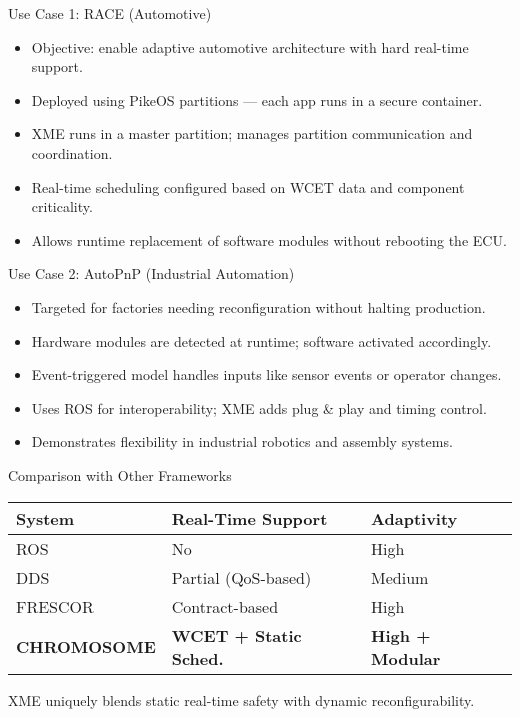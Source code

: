 \documentclass{beamer}
\begin{document}
\begin{frame}{Use Case 1: RACE (Automotive)}
  \begin{itemize}
    \item Objective: enable adaptive automotive architecture with hard real-time support.
    \item Deployed using PikeOS partitions — each app runs in a secure container.
    \item XME runs in a master partition; manages partition communication and coordination.
    \item Real-time scheduling configured based on WCET data and component criticality.
    \item Allows runtime replacement of software modules without rebooting the ECU.
  \end{itemize}
\end{frame}

\begin{frame}{Use Case 2: AutoPnP (Industrial Automation)}
  \begin{itemize}
    \item Targeted for factories needing reconfiguration without halting production.
    \item Hardware modules are detected at runtime; software activated accordingly.
    \item Event-triggered model handles inputs like sensor events or operator changes.
    \item Uses ROS for interoperability; XME adds plug \& play and timing control.
    \item Demonstrates flexibility in industrial robotics and assembly systems.
  \end{itemize}
\end{frame}

\begin{frame}{Comparison with Other Frameworks}
  \begin{tabular}{l|l|l}
    \textbf{System} & \textbf{Real-Time Support} & \textbf{Adaptivity} \\
    \hline
    ROS & No & High \\
    DDS & Partial (QoS-based) & Medium \\
    FRESCOR & Contract-based & High \\
    \textbf{CHROMOSOME} & \textbf{WCET + Static Sched.} & \textbf{High + Modular}
  \end{tabular}
  \vspace{1em}
  \smallskip
  XME uniquely blends static real-time safety with dynamic reconfigurability.
\end{frame}
\end{document}
